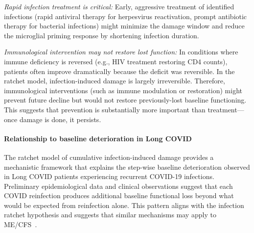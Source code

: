 \begin{speculation}
\textit{Rapid infection treatment is critical:} Early, aggressive treatment of identified infections (rapid antiviral therapy for herpesvirus reactivation, prompt antibiotic therapy for bacterial infections) might minimize the damage window and reduce the microglial priming response by shortening infection duration.

\textit{Immunological intervention may not restore lost function:} In conditions where immune deficiency is reversed (e.g., HIV treatment restoring CD4 counts), patients often improve dramatically because the deficit was reversible. In the ratchet model, infection-induced damage is largely irreversible. Therefore, immunological interventions (such as immune modulation or restoration) might prevent future decline but would not restore previously-lost baseline functioning. This suggests that prevention is substantially more important than treatment---once damage is done, it persists.

\paragraph{Relationship to baseline deterioration in Long COVID}

The ratchet model of cumulative infection-induced damage provides a mechanistic framework that explains the step-wise baseline deterioration observed in Long COVID patients experiencing recurrent COVID-19 infections. Preliminary epidemiological data and clinical observations suggest that each COVID reinfection produces additional baseline functional loss beyond what would be expected from reinfection alone. This pattern aligns with the infection ratchet hypothesis and suggests that similar mechanisms may apply to ME/CFS~\cite{PNAS2025MECFSLongCOVID}.

\end{speculation}

